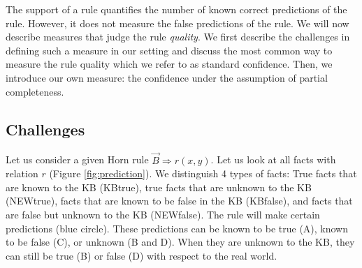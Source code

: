 
\label{sec:experimentsPCA}





The support of a rule quantifies the number of known correct predictions of the rule. However, it does not measure the false predictions of the rule.
We will now describe measures that judge the rule \emph{quality}.
We first describe the challenges in defining such a measure in our setting 
and discuss the most common way to measure the rule quality which we refer to as standard confidence.
Then, we introduce our own measure: the confidence under the assumption of partial completeness.




\subsection{Challenges}
Let us consider a given Horn rule $\vec{B} \Rightarrow r(x,y)$. Let us look at all facts with relation $r$ (Figure \ref{fig:prediction}).
We distinguish 4 types of facts: True facts that are known to the KB (KBtrue), true facts that are unknown to the KB (NEWtrue),
facts that are known to be false in the KB (KBfalse), and facts that are false but unknown to the KB (NEWfalse).
The rule will make certain predictions (blue circle). These predictions can be known to be true (A), known to be false (C), or unknown (B and D).
When they are unknown to the KB, they can still be true (B) or false (D) with respect to the real world.\\

